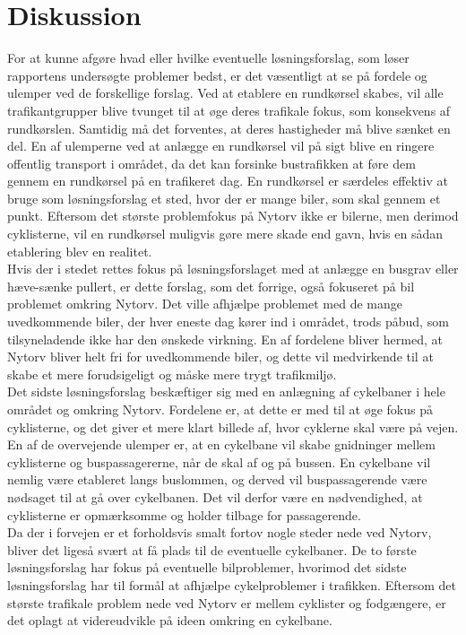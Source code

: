\chapter{Diskussion}
\label{chap:diskussion}
For at kunne afgøre hvad eller hvilke eventuelle løsningsforslag, som løser rapportens undersøgte problemer bedst, er det væsentligt at se på fordele og ulemper ved de forskellige forslag. Ved at etablere en rundkørsel skabes, vil alle trafikantgrupper blive tvunget til at øge deres trafikale fokus, som konsekvens af rundkørslen. Samtidig må det forventes, at deres hastigheder må blive sænket en del. En af ulemperne ved at anlægge en rundkørsel vil på sigt blive en ringere offentlig transport i området, da det kan forsinke bustrafikken at føre dem gennem en rundkørsel på en trafikeret dag. En rundkørsel er særdeles effektiv at bruge som løsningsforslag et sted, hvor der er mange biler, som skal gennem et punkt. Eftersom det største problemfokus på Nytorv ikke er bilerne, men derimod cyklisterne, vil en rundkørsel muligvis gøre mere skade end gavn, hvis en sådan etablering blev en realitet. ~\\
Hvis der i stedet rettes fokus på løsningsforslaget med at anlægge en busgrav eller hæve-sænke pullert, er dette forslag, som det forrige, også fokuseret på bil problemet omkring Nytorv. Det ville afhjælpe problemet med de mange uvedkommende biler, der hver eneste dag kører ind i området, trods påbud, som tilsyneladende ikke har den ønskede virkning. En af fordelene bliver hermed, at Nytorv bliver helt fri for uvedkommende biler, og dette vil medvirkende til at skabe et mere forudsigeligt og måske mere trygt trafikmiljø. ~\\
Det sidste løsningsforslag beskæftiger sig med en anlægning af cykelbaner i hele området og omkring Nytorv. Fordelene er, at dette er med til at øge fokus på cyklisterne, og det giver et mere klart billede af, hvor cyklerne skal være på vejen. En af de overvejende ulemper er, at en cykelbane vil skabe gnidninger mellem cyklisterne og buspassagererne, når de skal af og på bussen. En cykelbane vil nemlig være etableret langs buslommen, og derved vil buspassagerende være nødsaget til at gå over cykelbanen. Det vil derfor være en nødvendighed, at cyklisterne er opmærksomme og holder tilbage for passagerende. ~\\
Da der i forvejen er et forholdsvis smalt fortov nogle steder nede ved Nytorv, bliver det ligeså svært at få plads til de eventuelle cykelbaner. De to første løsningsforslag har fokus på eventuelle bilproblemer, hvorimod det sidste løsningsforslag har til formål at afhjælpe cykelproblemer i trafikken. Eftersom det største trafikale problem nede ved Nytorv er mellem cyklister og fodgængere, er det oplagt at videreudvikle på ideen omkring en cykelbane.
